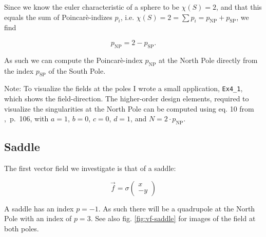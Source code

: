 \documentclass[a4paper,10pt,notitlepage]{scrartcl}
\begin{document}
Since we know the euler characteristic of a sphere to be $\chi(S) = 2$, and
that this equals the sum of Poincar\`e-indizes $p_i$, i.e. $\chi(S) = 2 =
\sum p_i = p_{\text{NP}} + p_{\text{SP}}$, we find

\begin{equation}
  p_{\text{NP}} = 2 - p_{\text{SP}}.
\end{equation}

As such we can compute the Poincar\`e-index $p_{\text{NP}}$ at the North Pole
directly from the index $p_{\text{SP}}$ of the South Pole.

Note: To visualize the fields at the poles I wrote a small application,
\texttt{Ex4\_1}, which shows the field-direction. The higher-order design
elements, required to visualize the singularities at the North Pole can be
computed using eq. 10 from \cite{tfd},~p.~106, with $a = 1$, $b = 0$, $c = 0$,
$d = 1$, and $N = 2 \cdot p_{\text{NP}}$.

\subsection{Saddle}

The first vector field we investigate is that of a saddle:

\begin{equation}
 \vec{f} = \sigma \left( \begin{array}{c}
                   x \\ -y
                  \end{array} \right)
 \label{eq:vf-saddle}
\end{equation}

A saddle has an index $p = -1$. As such there will be a quadrupole at the North
Pole with an index of $p = 3$. See also fig. \ref{fig:vf-saddle} for images
of the field at both poles.
\end{document}
